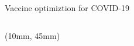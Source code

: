 \begin{frame}{Vaccine optimiztion for COVID-19}
\begin{textblock*}{65mm}
{\begin{block}{%
                }
{\begin{equation*}
                    \end{equation*}
                }
            \end{block}
        }
    \end{textblock*}
    \begin{textblock*}{115mm}(10mm, 45mm)
    \end{textblock*}
\end{frame}
%
%
%

